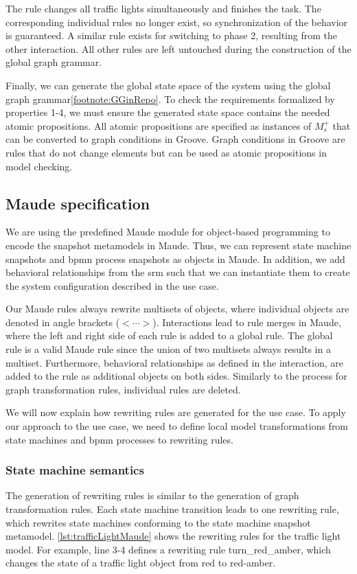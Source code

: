 \documentclass{jot}
\begin{document}
The rule changes all traffic lights simultaneously and finishes the task.
The corresponding individual rules no longer exist, so synchronization of the behavior is guaranteed.
A similar rule exists for switching to phase 2, resulting from the other interaction.
All other rules are left untouched during the construction of the global graph grammar.

Finally, we can generate the global state space of the system using the global graph grammar\cref{footnote:GGinRepo}.
To check the requirements formalized by properties 1-4, we must ensure the generated state space contains the needed atomic propositions.
All atomic propositions are specified as instances of $M_s^+$ that can be converted to graph conditions in Groove.
Graph conditions in Groove are rules that do not change elements but can be used as atomic propositions in model checking.


\subsection{Maude specification}
We are using the predefined Maude module for object-based programming to encode the snapshot metamodels in Maude.
Thus, we can represent state machine snapshots and \gls*{bpmn} process snapshots as objects in Maude.
In addition, we add behavioral relationships from the \gls*{srm} such that we can instantiate them to create the system configuration described in the use case.

Our Maude rules always rewrite multisets of objects, where individual objects are denoted in angle brackets ($<\cdots>$).
Interactions lead to rule merges in Maude, where the left and right side of each rule is added to a global rule.
The global rule is a valid Maude rule since the union of two multisets always results in a multiset. 
Furthermore, behavioral relationships as defined in the interaction, are added to the rule as additional objects on both sides.
Similarly to the process for graph transformation rules, individual rules are deleted.

We will now explain how rewriting rules are generated for the use case.
To apply our approach to the use case, we need to define local model transformations from state machines and \gls*{bpmn} processes to rewriting rules.


\subsubsection{State machine semantics}
The generation of rewriting rules is similar to the generation of graph transformation rules.
Each state machine transition leads to one rewriting rule, which rewrites state machines conforming to the state machine snapshot metamodel.
\autoref{lst:trafficLightMaude} shows the rewriting rules for the traffic light model.
For example, line 3-4 defines a rewriting rule \textsf{turn\_red\_amber}, which changes the state of a traffic light object from red to red-amber.
\end{document}

